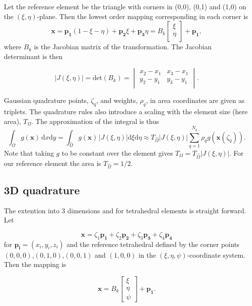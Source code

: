 \documentclass[paper=a4, fontsize=11pt]{scrartcl} %
\begin{document}
Let the reference element be the triangle with corners in (0,0), (0,1) and (1,0) on the $(\xi,\eta)$-plane. Then the lowest order mapping corresponding in each corner is
\[ \mathbf{x}= \mathbf{p_1}(1-\xi-\eta) +\mathbf{p_2}\xi +\mathbf{p_3}\eta = B_k\left[ \begin{array}{c} \xi\\ \eta\\ \end{array} \right] + \mathbf{p_1},
\]
where $B_k$ is the Jacobian matrix of the transformation. The Jacobian determinant is then

\begin{equation}
|J(\xi,\eta)| = \mathrm{det}(B_k) = \begin{vmatrix}
  x_2-x_1 & x_3-x_1 \\
  y_2-y_1 & y_3-y_1 \\
\end{vmatrix}.
  \label{eq:jacobian2d}
\end{equation}

Gaussian quadrature points, $\zeta_q$, and weights, $\rho_q$, in area coordinates are given as triplets. The quadrature rules also introduce a scaling with the element size (here area), $T_\Omega$. The approximation of the integral is thus
\[ \int_{\Omega} \! g(\mathbf{x}) \, \mathrm{d}x\mathrm{d}y = \int_{\hat{\Omega}} \! g(\mathbf{x}) \, |J(\xi,\eta)| \mathrm{d}\xi \mathrm{d}\eta \approx T_{\hat{\Omega}} |J(\xi,\eta)| \sum_{q=1}^{N_q} \rho_{q}g(\mathbf{x}(\zeta_q)).
\]
Note that taking $g$ to be constant over the element gives $T_{\Omega}=T_{\hat{\Omega}} |J(\xi,\eta)|$. For our reference element the area is $T_{\hat{\Omega}}=1/2$.

\subsection{3D quadrature}
The extention into 3 dimensions and for tetrahedral elements is straight forward. Let

\[ \mathbf{x} = \zeta_1\mathbf{p_1} +\zeta_2\mathbf{p_2} +\zeta_3\mathbf{p_3} + \zeta_4\mathbf{p_4} 
\]
for $\mathbf{p_i} =(x_i,y_i,z_i)$ and the reference tetrahedral defined by the corner points $(0,0,0)$,$(0,1,0)$,$(0,0,1)$ and $(1,0,0)$ in the $(\xi,\eta,\psi)$-coordinate system. Then the mapping is

\[ \mathbf{x}= B_k\left[ \begin{array}{c} \xi\\ \eta\\ \psi \end{array} \right] + \mathbf{p_1}.
\]
\end{document}
